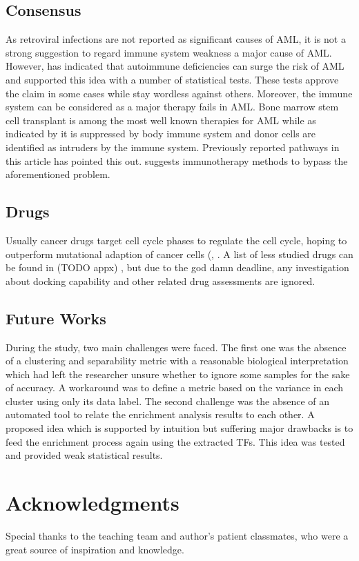 \documentclass[3p,authoryear,preprint,12pt]{elsarticle}
\begin{document}
\subsection{Consensus}
As retroviral infections are not reported as significant causes of AML, it is not a strong suggestion to regard immune system weakness a major cause of AML. However, \cite{Ramadan2012} has indicated that autoimmune deficiencies can surge the risk of AML and supported this idea with a number of statistical tests. These tests approve the claim in some cases while stay wordless against others. Moreover, the immune system can be considered as a major therapy fails in AML. Bone marrow stem cell transplant is among the most well known therapies for AML while as indicated by \cite{Horowitz555} it is suppressed by body immune system and donor cells are identified as intruders by the immune system. Previously reported pathways in this article has pointed this out. \cite{Lamble2018} suggests immunotherapy methods to bypass the aforementioned problem.

\subsection{Drugs}
Usually cancer drugs target cell cycle phases to regulate the cell cycle, hoping to outperform mutational adaption of cancer cells (\cite{Shapiro1999}, \cite{Bai2017}. A list of less studied drugs can be found in (TODO appx)
, but due to the god damn deadline, any investigation about docking capability and other related drug assessments are ignored.

\subsection{Future Works}
During the study, two main challenges were faced. The first one was the absence of a clustering and separability metric with a reasonable biological interpretation which had left the researcher unsure whether to ignore some samples for the sake of accuracy. A workaround was to define a metric based on the variance in each cluster using only its data label. The second challenge was the absence of an automated tool to relate the enrichment analysis results to each other. A proposed idea which is supported by intuition but suffering major drawbacks is to feed the enrichment process again using the extracted TFs. This idea was tested and provided weak statistical results.

\section*{Acknowledgments} Special thanks to the teaching team and author's patient classmates, who were a great source of inspiration and knowledge.
\end{document}
